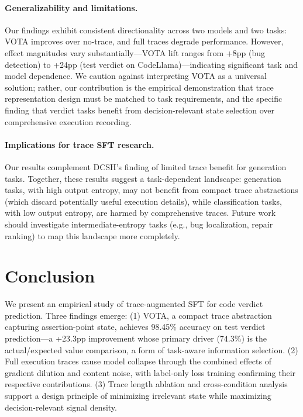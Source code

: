\documentclass[11pt]{article}
\begin{document}
\paragraph{Generalizability and limitations.}
Our findings exhibit consistent directionality across two models and two tasks: VOTA improves over no-trace, and full traces degrade performance. However, effect magnitudes vary substantially---VOTA lift ranges from +8pp (bug detection) to +24pp (test verdict on CodeLlama)---indicating significant task and model dependence. We caution against interpreting VOTA as a universal solution; rather, our contribution is the empirical demonstration that trace representation design must be matched to task requirements, and the specific finding that verdict tasks benefit from decision-relevant state selection over comprehensive execution recording.

\paragraph{Implications for trace SFT research.}
Our results complement DCSH's finding of limited trace benefit for generation tasks. Together, these results suggest a task-dependent landscape: generation tasks, with high output entropy, may not benefit from compact trace abstractions (which discard potentially useful execution details), while classification tasks, with low output entropy, are harmed by comprehensive traces. Future work should investigate intermediate-entropy tasks (e.g., bug localization, repair ranking) to map this landscape more completely.

\section{Conclusion}

We present an empirical study of trace-augmented SFT for code verdict prediction.
Three findings emerge:
(1) VOTA, a compact trace abstraction capturing assertion-point state, achieves 98.45\% accuracy on test verdict prediction---a +23.3pp improvement whose primary driver (74.3\%) is the actual/expected value comparison, a form of task-aware information selection.
(2) Full execution traces cause model collapse through the combined effects of gradient dilution and content noise, with label-only loss training confirming their respective contributions.
(3) Trace length ablation and cross-condition analysis support a design principle of minimizing irrelevant state while maximizing decision-relevant signal density.
\end{document}
